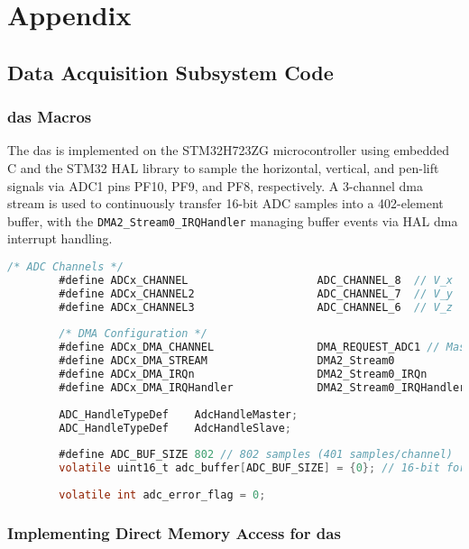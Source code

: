 \documentclass[class=report,11pt,crop=false]{standalone}
\begin{document}
	\chapter{Appendix}
	
	\section{Data Acquisition Subsystem Code}
	
	\subsection{\acrshort{das} Macros}
	
	The \acrfull{das} is implemented on the STM32H723ZG microcontroller using embedded C and the STM32 HAL library to sample the horizontal, vertical, and pen-lift signals via ADC1 pins PF10, PF9, and PF8, respectively. A 3-channel \acrshort{dma} stream is used to continuously transfer 16-bit ADC samples into a 402-element buffer, with the \texttt{DMA2\_Stream0\_IRQHandler} managing buffer events via HAL \acrshort{dma} interrupt handling.
	
	\begin{lstlisting}[language=C, label={lst:das-adc-macros}, caption={Showing macros for the \acrshort{adc} channels, \acrshort{dma} and the associated interrupts for handling streaming.}]
		/* ADC Channels */
		#define ADCx_CHANNEL                    ADC_CHANNEL_8  // V_x
		#define ADCx_CHANNEL2                   ADC_CHANNEL_7  // V_y
		#define ADCx_CHANNEL3                   ADC_CHANNEL_6  // V_z
		
		/* DMA Configuration */
		#define ADCx_DMA_CHANNEL                DMA_REQUEST_ADC1 // Master ADC1
		#define ADCx_DMA_STREAM                 DMA2_Stream0
		#define ADCx_DMA_IRQn                   DMA2_Stream0_IRQn
		#define ADCx_DMA_IRQHandler             DMA2_Stream0_IRQHandler
		
		ADC_HandleTypeDef    AdcHandleMaster;
		ADC_HandleTypeDef    AdcHandleSlave;
		
		#define ADC_BUF_SIZE 802 // 802 samples (401 samples/channel)
		volatile uint16_t adc_buffer[ADC_BUF_SIZE] = {0}; // 16-bit for interleaved data
		
		volatile int adc_error_flag = 0;
	\end{lstlisting}

	\subsection{Implementing Direct Memory Access for \acrshort{das}}
	
\end{document}
